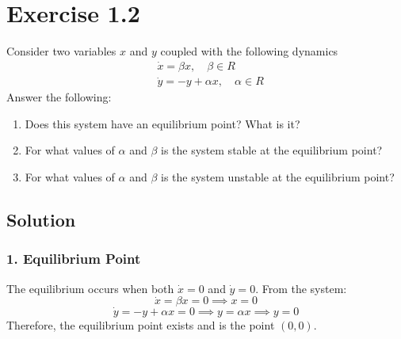 \section*{Exercise 1.2}

Consider two variables \( x \) and \( y \) coupled with the following dynamics
\begin{align*}
     & \dot{x}=\beta x, \quad \beta \in R      \\
     & \dot{y}=-y+\alpha x, \quad \alpha \in R
\end{align*}
Answer the following:
\begin{enumerate}[noitemsep]
    \item Does this system have an equilibrium point? What is it?
    \item For what values of \( \alpha \) and \( \beta \) is the system stable at the equilibrium point?
    \item For what values of \( \alpha \) and \( \beta \) is the system unstable at the equilibrium point?
\end{enumerate}

\subsection*{Solution}

\subsubsection*{1. Equilibrium Point}

The equilibrium occurs when both \(\dot{x} = 0\) and \(\dot{y} = 0\).
From the system:
\[
    \dot{x} = \beta x = 0 \implies x = 0
\]
\[
    \dot{y} = -y + \alpha x = 0 \implies y = \alpha x \implies y = 0
\]
Therefore, the equilibrium point exists and is the point \( \boxed{ (0, 0) }\).
